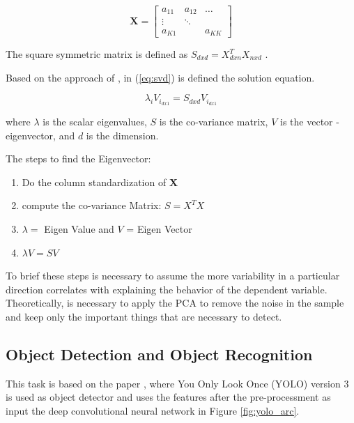 \begin{equation}\label{eq:matrix}
    \mathbf{X} = \begin{bmatrix} 
    a_{11} & a_{12} & \dots \\
    \vdots & \ddots & \\
    a_{K1} &        & a_{KK} 
    \end{bmatrix}
\end{equation}

The square symmetric matrix is defined as $S_{dxd} = X^T_{dxn}X_{nxd}$ \cite{Halko_2011}. 

Based on the approach of \cite{cambridge2009introduction}, in (\ref{eq:svd}) is defined the solution equation.

\begin{equation}
    \label{eq:svd}
    \lambda_i V_{i_{dx1}} = S_{dxd}V_{i_{dx1}}
\end{equation}

where $\lambda$ is the scalar eigenvalues, $S$ is the co-variance matrix, $V$ is the vector - eigenvector, and $d$ is the dimension.

The steps to find the Eigenvector: 

\begin{enumerate}
    \item Do the column standardization of $\mathbf{X}$
    \item compute the co-variance Matrix: $S = X^TX$
    \item $\lambda = $ Eigen Value and $V$ = Eigen Vector
    \item $\lambda V = SV$
\end{enumerate}

To brief these steps is necessary to assume the more variability in a particular direction correlates with explaining the behavior of the dependent variable. Theoretically, is necessary to apply the PCA to remove the noise in the sample and keep only the important things that are necessary to detect.


\subsection{Object Detection and Object Recognition} 

This task is based on the paper \cite{redmon2016you}, where You Only Look Once (YOLO) version 3 is used as object detector and uses the features after the pre-processment as input the deep convolutional neural network in Figure \ref{fig:yolo_arc}.  

